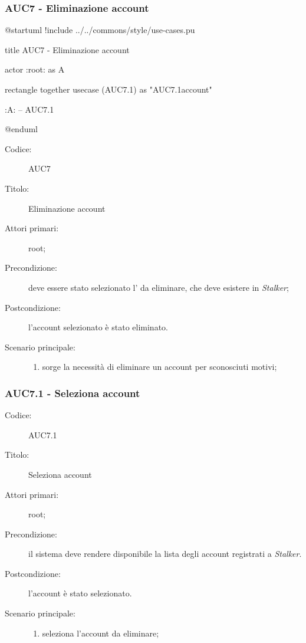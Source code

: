 \documentclass[casi-duso]{subfiles}
\begin{document}
\subsubsection{AUC7 - Eliminazione account}%
\label{subsub:AUC7}

\begin{plantuml}
@startuml
!include ../../commons/style/use-cases.pu

title AUC7 - Eliminazione account

actor :root: as A

rectangle {
  together {
    usecase (AUC7.1) as "AUC7.1\nSeleziona account"
  }
}

:A: -- AUC7.1

@enduml
\end{plantuml}

\begin{description}
  \item[Codice:] AUC7
  \item[Titolo:] Eliminazione account
  \item[Attori primari:] root;
  \item[Precondizione:] deve essere stato selezionato l' da eliminare, che deve esistere in \emph{Stalker};
  \item[Postcondizione:] l'account selezionato è stato eliminato.
  \item[Scenario principale:]
  \begin{enumerate}
    \item sorge la necessità di eliminare un account per sconosciuti motivi;
  \end{enumerate}
\end{description}

\subsubsection{AUC7.1 - Seleziona account}%
\label{subsub:AUC7.1}
\begin{description}
  \item[Codice:] AUC7.1
  \item[Titolo:] Seleziona account
  \item[Attori primari:] root;
  \item[Precondizione:] il sistema deve rendere disponibile la lista degli account registrati a \emph{Stalker}.
  \item[Postcondizione:] l'account è stato selezionato.
  \item[Scenario principale:]
  \begin{enumerate}
    \item {} seleziona l'account da eliminare;
  \end{enumerate}
\end{description}
\end{document}

